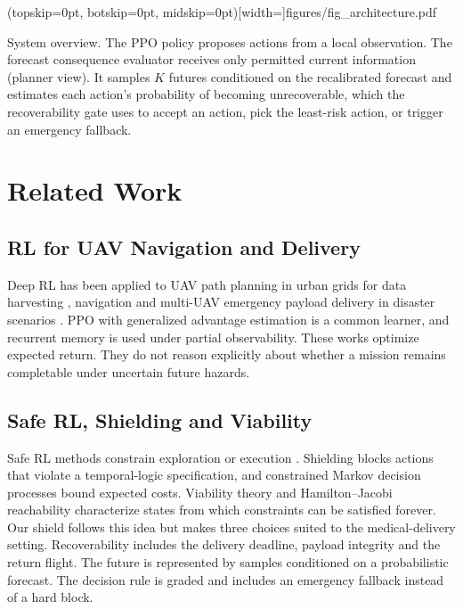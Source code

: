\documentclass{ieeeaccess}
\newcommand{\widecap}[1]{\parbox[t]{0.89\textwidth}{\raggedright #1}}
\begin{document}
\Figure[t!](topskip=0pt, botskip=0pt, midskip=0pt)[width=\textwidth]{figures/fig_architecture.pdf}
{\widecap{System overview. The PPO policy proposes actions from a local observation. The forecast consequence evaluator receives only permitted current information (planner view). It samples $K$ futures conditioned on the recalibrated forecast and estimates each action's probability of becoming unrecoverable, which the recoverability gate uses to accept an action, pick the least-risk action, or trigger an emergency fallback.}\label{fig:arch}}

\section{Related Work}
\label{sec:related}

\subsection{RL for UAV Navigation and Delivery}
Deep RL has been applied to UAV path planning in urban grids for data harvesting \cite{bayerlein2021}, navigation \cite{chikhaoui2022} and multi-UAV emergency payload delivery in disaster scenarios \cite{kutpanova2025}. PPO \cite{schulman2017} with generalized advantage estimation \cite{schulman2016} is a common learner, and recurrent memory \cite{hochreiter1997} is used under partial observability. These works optimize expected return. They do not reason explicitly about whether a mission remains completable under uncertain future hazards.

\subsection{Safe RL, Shielding and Viability}
Safe RL methods constrain exploration or execution \cite{garcia2015}. Shielding \cite{alshiekh2018} blocks actions that violate a temporal-logic specification, and constrained Markov decision processes \cite{altman1999} bound expected costs. Viability theory \cite{aubin1991} and Hamilton--Jacobi reachability \cite{fisac2019} characterize states from which constraints can be satisfied forever. Our shield follows this idea but makes three choices suited to the medical-delivery setting. Recoverability includes the delivery deadline, payload integrity and the return flight. The future is represented by samples conditioned on a probabilistic forecast. The decision rule is graded and includes an emergency fallback instead of a hard block.
\end{document}
